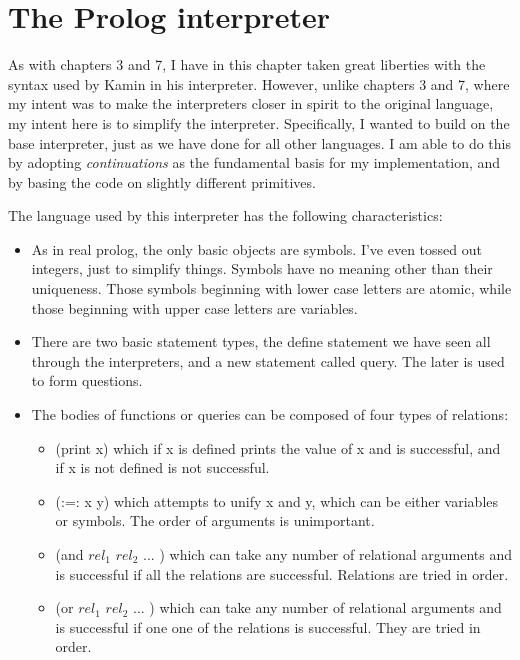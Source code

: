 \chapter{The Prolog interpreter}

As with chapters 3 and 7, I have in this chapter taken great liberties with the
syntax used by Kamin in his interpreter.  However, unlike chapters 3 and 7,
where my intent was to make the interpreters closer in spirit to the original
language, my intent here is to simplify the interpreter.  Specifically, I wanted
to build on the base interpreter, just as we have done for all other languages.
I am able to do this by adopting {\em continuations} as the fundamental basis
for my implementation, and by basing the code on slightly different primitives.

The language used by this interpreter has the following characteristics:
\begin{itemize}
    \item As in real prolog, the only basic objects are symbols.  I've even
    tossed out integers, just to simplify things.  Symbols have no meaning other
    than their uniqueness.  Those symbols beginning with lower case letters are
    atomic, while those beginning with upper case letters are variables.
    \item There are two basic statement types, the {\sf define} statement we
    have seen all through the interpreters, and a new statement called {\sf
        query}.  The later is used to form questions.
    \item The bodies of functions or queries can be composed of four types of
    relations:
    \begin{itemize}
        \item {\sf (print x)} which if x is defined prints the value of x and is
        successful, and if x is not defined is not successful.
        \item {\sf (:=: x y)} which attempts to unify x and y, which can be
        either variables or symbols.  The order of arguments is unimportant.
        \item {\sf (and $rel_1$ $rel_2$ ... )} which can take any number of
        relational arguments and is successful if all the relations are
        successful.  Relations are tried in order.
        \item {\sf (or $rel_1$ $rel_2$ ... )} which can take any number of
        relational arguments and is successful if one one of the relations is
        successful.  They are tried in order.
    \end{itemize}
\end{itemize}

